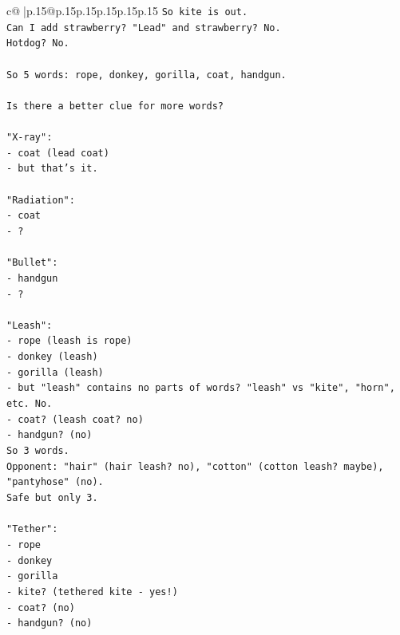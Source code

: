 \documentclass{article}
\begin{document}
{\begin{supertabular}{c@{$\;$}|p{.15\linewidth}@{}p{.15\linewidth}p{.15\linewidth}p{.15\linewidth}p{.15\linewidth}p{.15\linewidth}}
{{{\texttt{So kite is out.} \\
\texttt{Can I add strawberry? "Lead" and strawberry? No.} \\
\texttt{Hotdog? No.} \\
\\ 
\texttt{So 5 words: rope, donkey, gorilla, coat, handgun.} \\
\\ 
\texttt{Is there a better clue for more words?} \\
\\ 
\texttt{"X{-}ray":} \\
\texttt{{-} coat (lead coat)} \\
\texttt{{-} but that's it.} \\
\\ 
\texttt{"Radiation":} \\
\texttt{{-} coat} \\
\texttt{{-} ?} \\
\\ 
\texttt{"Bullet":} \\
\texttt{{-} handgun} \\
\texttt{{-} ?} \\
\\ 
\texttt{"Leash":} \\
\texttt{{-} rope (leash is rope)} \\
\texttt{{-} donkey (leash)} \\
\texttt{{-} gorilla (leash)} \\
\texttt{{-} but "leash" contains no parts of words? "leash" vs "kite", "horn", etc. No.} \\
\texttt{{-} coat? (leash coat? no)} \\
\texttt{{-} handgun? (no)} \\
\texttt{So 3 words.} \\
\texttt{Opponent: "hair" (hair leash? no), "cotton" (cotton leash? maybe), "pantyhose" (no).} \\
\texttt{Safe but only 3.} \\
\\ 
\texttt{"Tether":} \\
\texttt{{-} rope} \\
\texttt{{-} donkey} \\
\texttt{{-} gorilla} \\
\texttt{{-} kite? (tethered kite {-} yes!)} \\
\texttt{{-} coat? (no)} \\
\texttt{{-} handgun? (no)} \\
}}}
\end{supertabular}}
\end{document}
